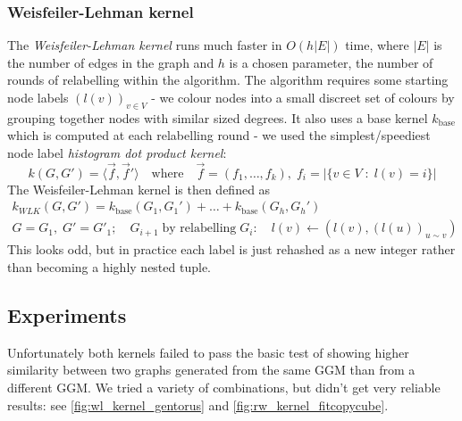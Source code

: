\subsubsection{Weisfeiler-Lehman kernel}
The \textit{Weisfeiler-Lehman kernel} runs much faster in $O(h|E|)$ time, where $|E|$ is the number of edges in the graph and $h$ is a chosen parameter, the number of rounds of relabelling within the algorithm. The algorithm requires some starting node labels $(l(v))_{v \in V}$ - we colour nodes into a small discreet set of colours by grouping together nodes with similar sized degrees. It also uses a base kernel $k_{\text{base}}$ which is computed at each relabelling round  - we used the simplest/speediest node label \textit{histogram dot product kernel}:
\begin{equation}
  k(G, G') = \langle \vec{f}, \vec{f}' \rangle \quad \text{where} \quad \vec{f} = (f_1, \dots, f_k), \;f_i = |\{ v \in V \;:\; l(v) = i\}|
\end{equation}
The Weisfeiler-Lehman kernel is then defined as
\begin{align}
  k_{WLK}(G, G') = k_{\text{base}}(G_1, G_1') + \dots + k_{\text{base}}(G_h, G_h')
\\
G =G_1,\; G' = G'_1 ; \quad G_{i+1}\; \text{by relabelling} \; G_i: \quad l(v) \gets (l(v), (l(u))_{u \sim v})
\end{align}
This looks odd, but in practice each label is just rehashed as a new integer rather than becoming a highly nested tuple.



\subsection{Experiments}

Unfortunately both kernels failed to pass the basic test of showing higher similarity between two graphs generated from the same GGM than from a different GGM. We tried a variety of combinations, but didn't get very reliable results: see \cref{fig:wl_kernel_gentorus} and \cref{fig:rw_kernel_fitcopycube}.


